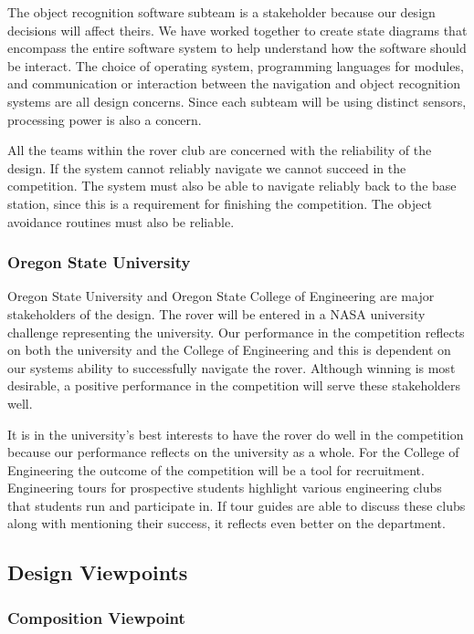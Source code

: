 \documentclass[10pt, oneside,onecolumn]{IEEEtran}
\begin{document}
\begin{titlepage}
The object recognition software subteam is a stakeholder because our design decisions will affect theirs. We have worked together to create state diagrams that encompass the entire software system to help understand how the software should be interact. The choice of operating system, programming languages for modules, and communication or interaction between the navigation and object recognition systems are all design concerns. Since each subteam will be using distinct sensors, processing power is also a concern. 

All the teams within the rover club are concerned with the reliability of the design. If the system cannot reliably navigate we cannot succeed in the competition. The system must also be able to navigate reliably back to the base station, since this is a requirement for finishing the competition. The object avoidance routines must also be reliable.

\subsubsection{Oregon State University}

Oregon State University and Oregon State College of Engineering are major stakeholders of the design. The rover will be entered in a NASA university challenge representing the university. Our performance in the competition reflects on both the university and the College of Engineering and this is dependent on our systems ability to successfully navigate the rover. Although winning is most desirable, a positive performance in the competition will serve these stakeholders well.

It is in the university's best interests to have the rover do well in the competition because our performance reflects on the university as a whole. For the College of Engineering the outcome of the competition will be a tool for recruitment. Engineering tours for prospective students highlight various engineering clubs that students run and participate in. If tour guides are able to discuss these clubs along with mentioning their success, it reflects even better on the department.

\subsection{Design Viewpoints}

\subsubsection{Composition Viewpoint}


\end{titlepage}
\end{document}
